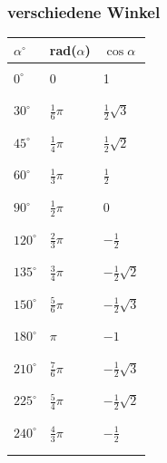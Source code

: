 \documentclass[6pt,a4paper]{scrartcl}
\begin{document}
\begin{multicols*}{2}
\subsubsection{verschiedene Winkel}
\begin{tabular}{lll}
$\alpha^\circ$&rad($\alpha$)&$\cos{\alpha}$\\
\hline
\\
$0^\circ$ & 0 & 1 \\
\\
\hline
\\
$30^\circ$  & $\frac{1}{6}\pi$  & $\frac{1}{2}\sqrt{3}$ \\
\\
\hline
\\
$45^\circ$  & $\frac{1}{4}\pi$  & $\frac{1}{2}\sqrt{2}$ \\
\\
\hline
\\
$60^\circ$  & $\frac{1}{3}\pi$  & $\frac{1}{2}$ \\
\\
\hline
\\
$90^\circ$  & $\frac{1}{2}\pi$  & $0$ \\
\\
\hline
\\
$120^\circ$ & $\frac{2}{3}\pi$  & $-\frac{1}{2}$ \\
\\
\hline
\\
$135^\circ$ & $\frac{3}{4}\pi$  & $-\frac{1}{2}\sqrt{2}$ \\
\\
\hline
\\
$150^\circ$ & $\frac{5}{6}\pi$  & $-\frac{1}{2}\sqrt{3}$ \\
\\
\hline
\\
$180^\circ$ & $\pi$             & $-1$ \\
\\
\hline
\\
$210^\circ$ & $\frac{7}{6}\pi$  & $-\frac{1}{2}\sqrt{3}$ \\
\\
\hline
\\
$225^\circ$ & $\frac{5}{4}\pi$  & $-\frac{1}{2}\sqrt{2}$ \\
\\
\hline
\\
$240^\circ$ & $\frac{4}{3}\pi$  & $-\frac{1}{2}$ \\
\\
\hline
\\

\end{tabular}
\end{multicols*}
\end{document}
